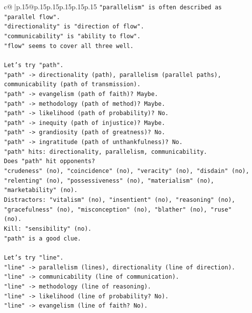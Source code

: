 \documentclass{article}
\begin{document}
{\begin{supertabular}{c@{$\;$}|p{.15\linewidth}@{}p{.15\linewidth}p{.15\linewidth}p{.15\linewidth}p{.15\linewidth}p{.15\linewidth}}
{{{\texttt{"parallelism" is often described as "parallel flow".} \\
\texttt{"directionality" is "direction of flow".} \\
\texttt{"communicability" is "ability to flow".} \\
\texttt{"flow" seems to cover all three well.} \\
\\ 
\texttt{Let's try "path".} \\
\texttt{"path" {-}> directionality (path), parallelism (parallel paths), communicability (path of transmission).} \\
\texttt{"path" {-}> evangelism (path of faith)? Maybe.} \\
\texttt{"path" {-}> methodology (path of method)? Maybe.} \\
\texttt{"path" {-}> likelihood (path of probability)? No.} \\
\texttt{"path" {-}> inequity (path of injustice)? Maybe.} \\
\texttt{"path" {-}> grandiosity (path of greatness)? No.} \\
\texttt{"path" {-}> ingratitude (path of unthankfulness)? No.} \\
\texttt{"path" hits: directionality, parallelism, communicability.} \\
\texttt{Does "path" hit opponents?} \\
\texttt{"crudeness" (no), "coincidence" (no), "veracity" (no), "disdain" (no), "relenting" (no), "possessiveness" (no), "materialism" (no), "marketability" (no).} \\
\texttt{Distractors: "vitalism" (no), "insentient" (no), "reasoning" (no), "gracefulness" (no), "misconception" (no), "blather" (no), "ruse" (no).} \\
\texttt{Kill: "sensibility" (no).} \\
\texttt{"path" is a good clue.} \\
\\ 
\texttt{Let's try "line".} \\
\texttt{"line" {-}> parallelism (lines), directionality (line of direction).} \\
\texttt{"line" {-}> communicability (line of communication).} \\
\texttt{"line" {-}> methodology (line of reasoning).} \\
\texttt{"line" {-}> likelihood (line of probability? No).} \\
\texttt{"line" {-}> evangelism (line of faith? No).} \\
}}}
\end{supertabular}}
\end{document}
